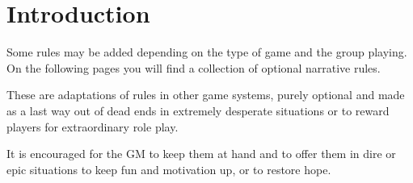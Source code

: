 \documentclass[12pt,a4paper,openany,usenames,dvipsnames]{book}
\begin{document}
	

	\chapter{Introduction}
	Some rules may be added depending on the type of game and the group playing. On the following pages you will find a collection of optional narrative rules.
	\par
	These are adaptations of rules in other game systems, purely optional and made as a last way out of dead ends in extremely desperate situations or to reward players for extraordinary role play.
	\par
	It is encouraged for the GM to keep them at hand and to offer them in dire or epic situations to keep fun and motivation up, or to restore hope.
\end{document}
